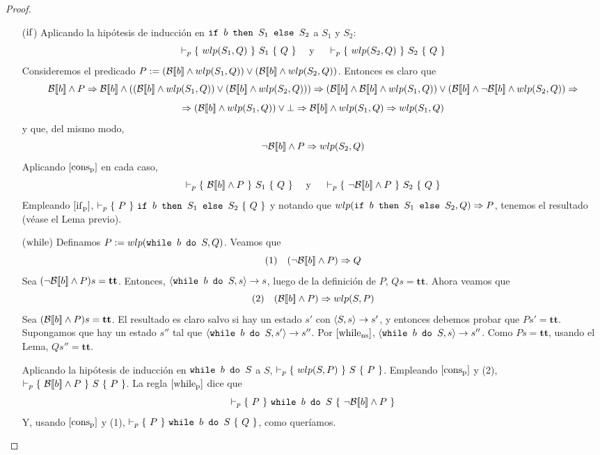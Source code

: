 \begin{proof}
\begin{itemize}
    
    
    \item[($\mathrm{if}$)] Aplicando la hipótesis de inducción en $\texttt{if }b\texttt{ then }S_1\texttt{ else }S_2$ a $S_1$ y $S_2$:
    $$\vdash_p \{\, \, wlp(S_1, Q) \, \, \}\, \, S_1\, \, \{ \, \, Q \, \, \} \quad \text{ y } \quad \vdash_p \{\, \, wlp(S_2, Q) \, \, \}\, \, S_2\, \, \{ \, \, Q \, \, \}$$
    Consideremos el predicado $P := (\mathcal{B}[\![b]\!]\land wlp(S_1, Q)) \lor (\mathcal{B}[\![b]\!]\land wlp(S_2, Q))$. Entonces es claro que 
    $$\fc{B}{b}\land P \dto \fc{B}{b} \land ((\fc{B}{b}\land wlp(S_1, Q)) \lor (\fc{B}{b}\land wlp(S_2, Q))) \dto (\fc{B}{b}\land \fc{B}{b}\land wlp(S_1, Q)) \lor (\fc{B}{b}\land \neg\fc{B}{b}\land wlp(S_2, Q)) \dto $$ $$ \Rightarrow (\mathcal{B}[\![b]\!]\land wlp(S_1, Q)) \lor \bot \Rightarrow \mathcal{B}[\![b]\!]\land wlp(S_1, Q) \Rightarrow wlp(S_1, Q)$$
    y que, del mismo modo, 
    $$\neg\mathcal{B}[\![b]\!] \land P \Rightarrow wlp(S_2, Q)$$
    Aplicando $[\mathrm{cons}_{\mathrm{p}}]$ en cada caso, 
    $$\vdash_p \{\, \, \mathcal{B}[\![b]\!]\land P \, \, \}\, \, S_1\, \, \{ \, \, Q \, \, \}\quad \text{ y } \quad \vdash_p \{\, \, \neg\mathcal{B}[\![b]\!]\land P \, \, \}\, \, S_2\, \, \{ \, \, Q \, \, \}$$
    Empleando $[\mathrm{if}_{\mathrm{p}}]$, $\vdash_p \{\, \, P \, \, \}\, \, \texttt{if }b\texttt{ then }S_1\texttt{ else }S_2\, \, \{ \, \, Q \, \, \}$ y notando que $wlp(\texttt{if }b\texttt{ then }S_1\texttt{ else }S_2, Q) \Rightarrow P$, tenemos el resultado (véase el Lema previo).
    \item[($\mathrm{while}$)] Definamos $P:= wlp(\texttt{while }b \texttt{ do }S, Q)$. Veamos que 
    $$(1) \quad (\neg\mathcal{B}[\![b]\!]\land P) \Rightarrow Q$$
    Sea $(\neg\mathcal{B}[\![b]\!]\land P)s = \mathbf{tt}$. Entonces, $\langle \texttt{while }b\texttt{ do }S, s \rangle \to s$, luego de la definición de $P$, $Qs = \mathbf{tt}$. Ahora veamos que
    $$(2) \quad (\mathcal{B}[\![b]\!]\land P) \Rightarrow wlp(S, P)$$
    Sea $(\mathcal{B}[\![b]\!]\land P)s = \mathbf{tt}$. El resultado es claro salvo si hay un estado $s'$ con $\langle S, s \rangle\to s'$, y entonces debemos probar que $Ps' = \mathbf{tt}$. Supongamos que hay un estado $s''$ tal que $\langle \texttt{while }b\texttt{ do }S, s' \rangle\to s''$. Por $[\mathrm{while}_{\mathrm{ns}}]$, $\langle \texttt{while }b\texttt{ do }S, s \rangle\to s''$. Como $Ps= \mathbf{tt}$, usando el Lema, $Qs'' = \mathbf{tt}$.
    
    Aplicando la hipótesis de inducción en $\texttt{while }b\texttt{ do }S$ a $S$, $\vdash_p \{\, \, wlp(S, P) \, \, \}\, \, S\, \, \{ \, \, P \, \, \}$. Empleando $[\mathrm{cons}_{\mathrm{p}}]$ y (2), $\vdash_p \{\, \, \mathcal{B}[\![b]\!]\land P \, \, \}\, \, S\, \, \{ \, \, P \, \, \}$. La regla $[\mathrm{while}_{\mathrm{p}}]$ dice que 
    $$\vdash_p \{\, \, P \, \, \}\, \, \texttt{while }b\texttt{ do }S\, \, \{ \, \, \neg\mathcal{B}[\![b]\!]\land P \, \, \}$$
    Y, usando $[\mathrm{cons}_{\mathrm{p}}]$ y (1), $\vdash_p \{\, \, P \, \, \}\, \, \texttt{while }b\texttt{ do }S\, \, \{ \, \, Q \, \, \}$, como queríamos.
\end{itemize}
\end{proof}
